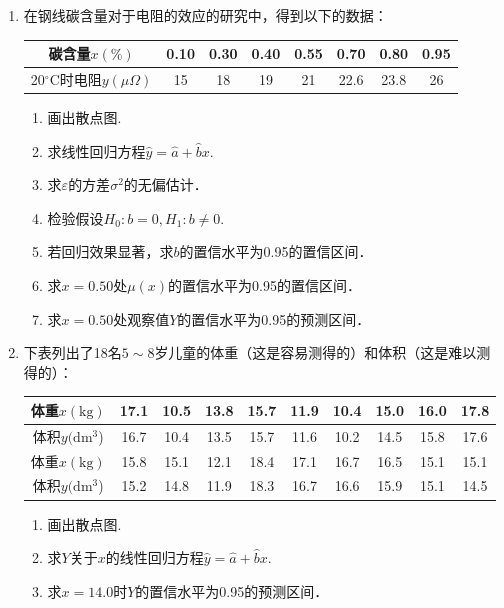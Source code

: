 \begin{enumerate}
    \item 在钢线碳含量对于电阻的效应的研究中，得到以下的数据：
    \renewcommand{\arraystretch}{1.3}
    \begin{table}[H]\centering
        \begin{tabular}{c|ccccccc}
        \hline
        碳含量$x(\%)$  & 0.10 & 0.30 & 0.40 & 0.55 & 0.70 & 0.80 & 0.95 \\ \hline
        20$^{\circ}$C时电阻$y(\mu\Omega)$ & 15   & 18   & 19   & 21   & 22.6 & 23.8 & 26   \\ \hline
        \end{tabular}
    \end{table}
    \renewcommand{\arraystretch}{1.0}
    \begin{enumerate}
        \item 画出散点图.
        \item 求线性回归方程$\hat{y}=\hat{a}+\hat{b}x$.
        \item 求$\varepsilon$的方差$\sigma^2$的无偏估计．
        \item 检验假设$H_0:b=0,H_1:b\neq 0$.
        \item 若回归效果显著，求$b$的置信水平为0.95的置信区间．
        \item 求$x=0.50$处$\mu(x)$的置信水平为0.95的置信区间．
        \item 求$x=0.50$处观察值$Y$的置信水平为0.95的预测区间．
    \end{enumerate}


    \item 下表列出了18名$5\sim 8$岁儿童的体重（这是容易测得的）和体积（这是难以测得的）：
    \renewcommand{\arraystretch}{1.3}
    \begin{table}[H]\centering
        \begin{tabular}{c|ccccccccc}
        \hline
        体重$x(\mathrm{kg})$            & 17.1 & 10.5 & 13.8 & 15.7 & 11.9 & 10.4 & 15.0 & 16.0 & 17.8 \\ \hline
        体积$y(\mathrm{dm^3}$) & 16.7 & 10.4 & 13.5 & 15.7 & 11.6 & 10.2 & 14.5 & 15.8 & 17.6 \\ \hline
        体重$x(\mathrm{kg})$           & 15.8 & 15.1 & 12.1 & 18.4 & 17.1 & 16.7 & 16.5 & 15.1 & 15.1 \\ \hline
        体积$y(\mathrm{dm^3}$) & 15.2 & 14.8 & 11.9 & 18.3 & 16.7 & 16.6 & 15.9 & 15.1 & 14.5 \\ \hline
        \end{tabular}
    \end{table}
    \renewcommand{\arraystretch}{1.0}
    \begin{enumerate}
        \item 画出散点图.
        \item 求$Y$关于$x$的线性回归方程$\hat{y}=\hat{a}+\hat{b}x$.
        \item 求$x=14.0$时$Y$的置信水平为0.95的预测区间．
    \end{enumerate}






\end{enumerate}
